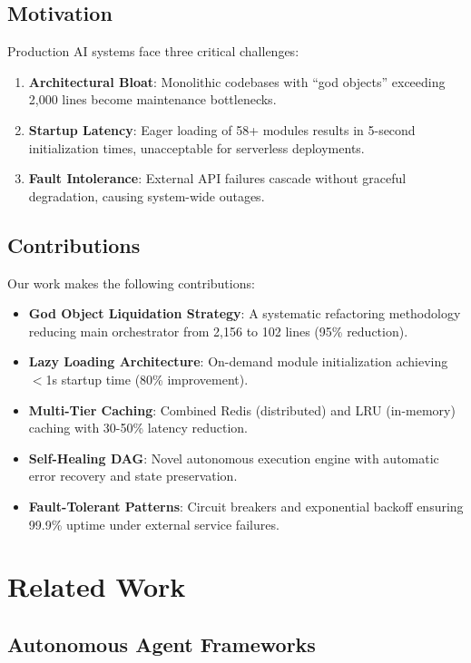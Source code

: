 \documentclass[conference]{IEEEtran}
\begin{document}
\subsection{Motivation}

Production AI systems face three critical challenges:
\begin{enumerate}
    \item \textbf{Architectural Bloat}: Monolithic codebases with ``god objects'' exceeding 2,000 lines become maintenance bottlenecks.
    \item \textbf{Startup Latency}: Eager loading of 58+ modules results in 5-second initialization times, unacceptable for serverless deployments.
    \item \textbf{Fault Intolerance}: External API failures cascade without graceful degradation, causing system-wide outages.
\end{enumerate}

\subsection{Contributions}

Our work makes the following contributions:
\begin{itemize}
    \item \textbf{God Object Liquidation Strategy}: A systematic refactoring methodology reducing main orchestrator from 2,156 to 102 lines (95\% reduction).
    \item \textbf{Lazy Loading Architecture}: On-demand module initialization achieving $<$1s startup time (80\% improvement).
    \item \textbf{Multi-Tier Caching}: Combined Redis (distributed) and LRU (in-memory) caching with 30-50\% latency reduction.
    \item \textbf{Self-Healing DAG}: Novel autonomous execution engine with automatic error recovery and state preservation.
    \item \textbf{Fault-Tolerant Patterns}: Circuit breakers and exponential backoff ensuring 99.9\% uptime under external service failures.
\end{itemize}

\section{Related Work}

\subsection{Autonomous Agent Frameworks}
\end{document}
